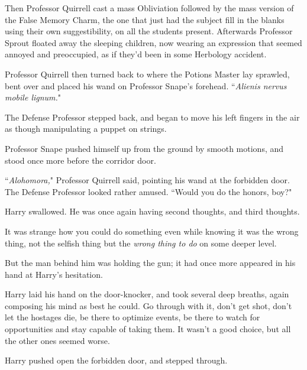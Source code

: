 Then Professor Quirrell cast a mass Obliviation followed by the mass version of the False Memory Charm, the one that just had the subject fill in the blanks using their own suggestibility, on all the students present. Afterwards Professor Sprout floated away the sleeping children, now wearing an expression that seemed annoyed and preoccupied, as if they'd been in some Herbology accident.

Professor Quirrell then turned back to where the Potions Master lay sprawled, bent over and placed his wand on Professor Snape's forehead. ``\emph{Alienis nervus mobile lignum.}"

The Defense Professor stepped back, and began to move his left fingers in the air as though manipulating a puppet on strings.

Professor Snape pushed himself up from the ground by smooth motions, and stood once more before the corridor door.

``\emph{Alohomora,}" Professor Quirrell said, pointing his wand at the forbidden door. The Defense Professor looked rather amused. ``Would you do the honors, boy?"

Harry swallowed. He was once again having second thoughts, and third thoughts.

It was strange how you could do something even while knowing it was the wrong thing, not the selfish thing but the \emph{wrong thing to do} on some deeper level.

But the man behind him was holding the gun; it had once more appeared in his hand at Harry's hesitation.

Harry laid his hand on the door-knocker, and took several deep breaths, again composing his mind as best he could. Go through with it, don't get shot, don't let the hostages die, be there to optimize events, be there to watch for opportunities and stay capable of taking them. It wasn't a good choice, but all the other ones seemed worse.

Harry pushed open the forbidden door, and stepped through.

